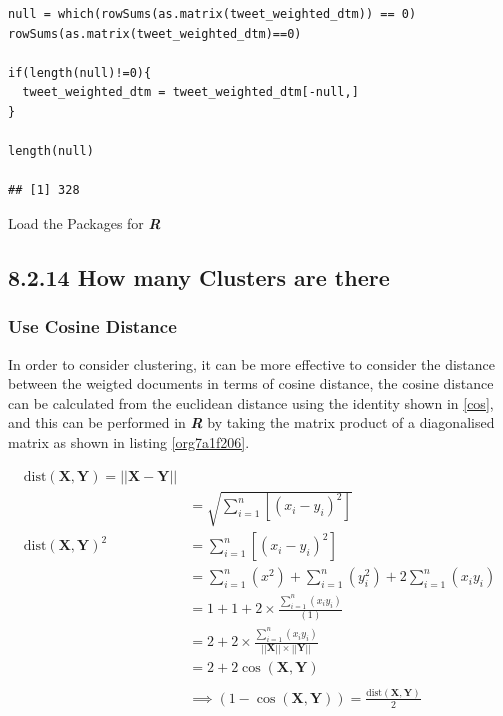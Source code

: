 \documentclass[11pt]{article}
\begin{document}
\begin{listing}[htbp]
\begin{verbatim}
null = which(rowSums(as.matrix(tweet_weighted_dtm)) == 0)
rowSums(as.matrix(tweet_weighted_dtm)==0)

if(length(null)!=0){
  tweet_weighted_dtm = tweet_weighted_dtm[-null,]
}

length(null)

## [1] 328
\end{verbatim}
\caption{\label{org3bba59f}Load the Packages for \textbf{\textbf{\emph{R}}}}
\end{listing}
\subsection{8.2.14 How many Clusters are there}
\label{sec:org2cdd52a}
\subsubsection{Use Cosine Distance}
\label{sec:orgadea631}
In order to consider clustering, it can be more effective to consider the distance between the weigted documents in terms of cosine distance, the cosine distance can be calculated from the euclidean distance using the identity shown in \eqref{cos}, and this can be performed in \textbf{\emph{R}} by taking the matrix product of a diagonalised matrix as shown in listing \ref{org7a1f206}.

\begin{align}
\mathrm{dist}\left( \mathbf{X}, \mathbf{Y} \right)= \left| \left| \mathbf{X}-\mathbf{Y} \right| \right| \\
&= \sqrt{\sum^{n}_{i= 1}   \left[ \left( x_i-y_i \right)^2 \right] } \\
\mathrm{dist}\left( \mathbf{X}, \mathbf{Y} \right)^2&= \sum^{n}_{i= 1}  \left[ \left( x_i-y_i \right)^2 \right] \\
&= \sum^{n}_{i= 1}   \left( x^2 \right)+  \sum^{n}_{i= 1}   \left( y_i^2 \right)+ 2 \sum^{n}_{i= 1}   \left( x_iy_i \right) \\
&= 1+ 1 +  2 \times  \frac{\sum^{n}_{i= 1}   \left( x_iy_i \right)}{\left( 1 \right) }\\
&= 2+ 2\times \frac{\sum^{n}_{i= 1}   \left( x_iy_i \right)}{\left| \left| \mathbf{X} \right| \right|\times \left| \left| \mathbf{Y} \right| \right|}\\
&= 2+ 2 \cos\left( \mathbf{X}, \mathbf{Y} \right)\\
\ \\
& \implies  \left( 1- \cos\left( \mathbf{X}, \mathbf{Y} \right) \right) = \frac{\mathrm{dist}\left( \mathbf{X}, \mathbf{Y} \right)}{2} \label{cos}
\end{align}
\end{document}
